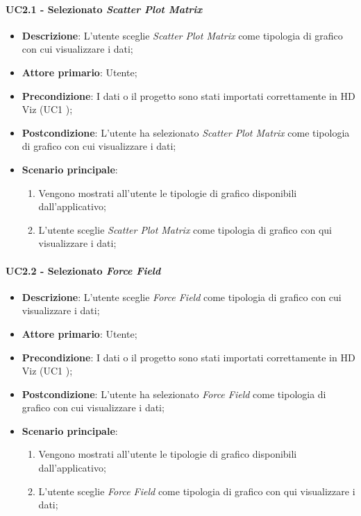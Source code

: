 \paragraph{UC2.1 - Selezionato \emph{Scatter Plot Matrix}}
\label{ssub:uc2.1}

\begin{itemize}
	\item \textbf{Descrizione}: L'utente sceglie \emph{Scatter Plot Matrix} come tipologia di grafico con cui visualizzare i dati;
	\item \textbf{Attore primario}: Utente;
	\item \textbf{Precondizione}: I dati o il progetto sono stati importati correttamente in HD Viz (UC1 );
	\item \textbf{Postcondizione}: L'utente ha selezionato \emph{Scatter Plot Matrix} come tipologia di grafico con cui visualizzare i dati;
	\item \textbf{Scenario principale}:
		\begin{enumerate}
			\item Vengono mostrati all'utente le tipologie di grafico disponibili dall'applicativo;
			\item L'utente sceglie \emph{Scatter Plot Matrix} come tipologia di grafico con qui visualizzare i dati;
		\end{enumerate}
\end{itemize}

\paragraph{UC2.2 - Selezionato \emph{Force Field}}
\label{ssub:uc2.2}

\begin{itemize}
	\item \textbf{Descrizione}: L'utente sceglie \emph{Force Field} come tipologia di grafico con cui visualizzare i dati;
	\item \textbf{Attore primario}: Utente;
	\item \textbf{Precondizione}: I dati o il progetto sono stati importati correttamente in HD Viz (UC1 );
	\item \textbf{Postcondizione}: L'utente ha selezionato \emph{Force Field} come tipologia di grafico con cui visualizzare i dati;
	\item \textbf{Scenario principale}:
		\begin{enumerate}
			\item Vengono mostrati all'utente le tipologie di grafico disponibili dall'applicativo;
			\item L'utente sceglie \emph{Force Field} come tipologia di grafico con qui visualizzare i dati;
		\end{enumerate}
\end{itemize}


